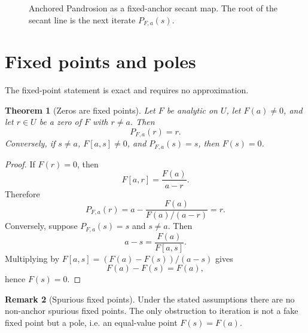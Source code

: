 \documentclass[11pt]{article}
\newtheorem{theorem}{Theorem}[section]
\theoremstyle{definition}
\newtheorem{remark}[theorem]{Remark}
\begin{document}
\begin{figure}[t]
\centering
{}
\caption{Anchored Pandrosion as a fixed-anchor secant map.  The root of the secant line is the next iterate $P_{F,a}(s)$.}
\end{figure}

\section{Fixed points and poles}

The fixed-point statement is exact and requires no approximation.

\begin{theorem}[Zeros are fixed points]
Let $F$ be analytic on $U$, let $F(a)\ne0$, and let $r\in U$ be a zero of $F$ with $r\ne a$.  Then
\[
        P_{F,a}(r)=r.
\]
Conversely, if $s\ne a$, $F[a,s]\ne0$, and $P_{F,a}(s)=s$, then $F(s)=0$.
\end{theorem}

\begin{proof}
If $F(r)=0$, then
\[
        F[a,r]=\frac{F(a)}{a-r}.
\]
Therefore
\[
        P_{F,a}(r)=a-\frac{F(a)}{F(a)/(a-r)}=r.
\]
Conversely, suppose $P_{F,a}(s)=s$ and $s\ne a$.  Then
\[
        a-s=\frac{F(a)}{F[a,s]}.
\]
Multiplying by $F[a,s]=(F(a)-F(s))/(a-s)$ gives
\[
        F(a)-F(s)=F(a),
\]
hence $F(s)=0$.
\end{proof}

\begin{remark}[Spurious fixed points]
Under the stated assumptions there are no non-anchor spurious fixed points.  The only obstruction to iteration is not a fake fixed point but a pole, i.e. an equal-value point $F(s)=F(a)$.
\end{remark}
\end{document}
